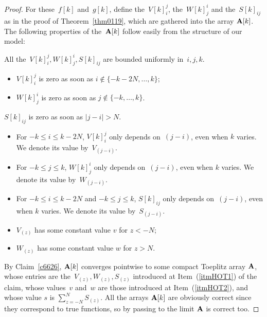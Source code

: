 \begin{proof}
For these~$f[k]$ and~$g[k]$, define the~$V[k]^j_i$, the~$W[k]_j^i$ and the~$S[k]_{ij}$
as in the proof of Theorem~\ref{thm0119}, which are gathered into the array $\mathbf{A}[k]$.
%
The following properties of the~$\mathbf{A}[k]$
follow easily from the structure of our model:
%
\begin{Clm}\label{c6626}\strut
\begin{ienumerate}
\item All the~$V[k]^j_i, W[k]_j^i, S[k]_{ij}$ are bounded uniformly in~$i,j,k$.
\item\begin{itemize}\item $V[k]^j_i$ is zero as soon as $i\notin\{-k-2N,\ldots,k\}$;
\item $W[k]_j^i$ is zero as soon as $j\notin\{-k,\ldots,k\}$.\end{itemize}
\item $S[k]_{ij}$ is zero as soon as $|j-i| > N$.
\item\label{itmHOT1}\begin{itemize}\item For $-k\leq i\leq k-2N$,
$V[k]^j_i$ only depends on~$(j-i)$, even when $k$ varies. We denote its value by~$V_{(j-i)}$.
\item For $-k\leq j\leq k$,
$W[k]_j^i$ only depends on~$(j-i)$, even when $k$ varies. We denote its value by~$W_{(j-i)}$.
\item For $-k\leq i\leq k-2N$ and $-k\leq j\leq k$,
$S[k]_{ij}$ only depends on~$(j-i)$, even when $k$ varies. We denote its value by~$S_{(j-i)}$.\end{itemize}
\item\label{itmHOT2}\begin{itemize}\item $V_{(z)}$ has some constant value $v$ for $z < -N$;
\item $W_{(z)}$ has some constant value $w$ for $z > N$.
\end{itemize}
\end{ienumerate}
\end{Clm}
%
\noindent By Claim~\ref{c6626}, $\mathbf{A}[k]$ converges pointwise to
some compact Toeplitz array $\mathbf{A}$, whose entries are the~$V_{(z)}, W_{(z)}, S_{(z)}$
introduced at Item~(\ref{itmHOT1}) of the claim,
whose values~$v$ and~$w$ are those introduced at Item~(\ref{itmHOT2}),
and whose value $s$ is $\sum_{z=-N}^{N} S_{(z)}$.
All the arrays $\mathbf{A}[k]$ are obviously correct since they correspond to true functions,
so by passing to the limit $\mathbf{A}$ is correct too.


\end{proof}
